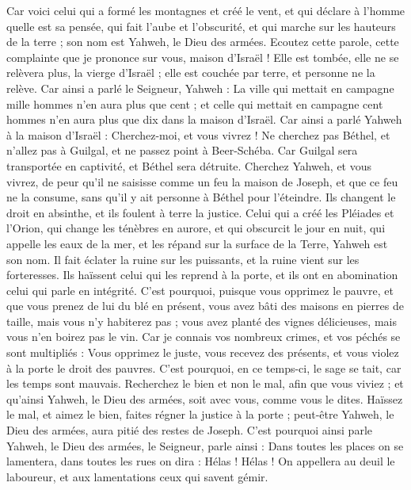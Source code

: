 \begin{multicols}{2}
Car voici celui qui a formé les montagnes et créé le vent, et qui déclare à l'homme quelle est sa pensée, qui fait l'aube et l'obscurité, et qui marche sur les hauteurs de la terre ; son nom est Yahweh, le Dieu des armées.
\VerseOne{}Ecoutez cette parole, cette complainte que je prononce sur vous, maison d'Israël !
Elle est tombée, elle ne se relèvera plus, la vierge d'Israël ; elle est couchée par terre, et personne ne la relève.
Car ainsi a parlé le Seigneur, Yahweh : La ville qui mettait en campagne mille hommes n'en aura plus que cent ; et celle qui mettait en campagne cent hommes n'en aura plus que dix dans la maison d’Israël.
Car ainsi a parlé Yahweh à la maison d'Israël : Cherchez-moi, et vous vivrez !
Ne cherchez pas Béthel, et n'allez pas à Guilgal, et ne passez point à Beer-Schéba. Car Guilgal sera transportée en captivité, et Béthel sera détruite.
Cherchez Yahweh, et vous vivrez, de peur qu'il ne saisisse comme un feu la maison de Joseph, et que ce feu ne la consume, sans qu'il y ait personne à Béthel pour l’éteindre.
Ils changent le droit en absinthe, et ils foulent à terre la justice.
Celui qui a créé les Pléiades et l'Orion, qui change les ténèbres en aurore, et qui obscurcit le jour en nuit, qui appelle les eaux de la mer, et les répand sur la surface de la Terre, Yahweh est son nom.
Il fait éclater la ruine sur les puissants, et la ruine vient sur les forteresses.
Ils haïssent celui qui les reprend à la porte, et ils ont en abomination celui qui parle en intégrité.
C'est pourquoi, puisque vous opprimez le pauvre, et que vous prenez de lui du blé en présent, vous avez bâti des maisons en pierres de taille, mais vous n'y habiterez pas ; vous avez planté des vignes délicieuses, mais vous n'en boirez pas le vin.
Car je connais vos nombreux crimes, et vos péchés se sont multipliés : Vous opprimez le juste, vous recevez des présents, et vous violez à la porte le droit des pauvres.
C'est pourquoi, en ce temps-ci, le sage se tait, car les temps sont mauvais.
Recherchez le bien et non le mal, afin que vous viviez ; et qu’ainsi Yahweh, le Dieu des armées, soit avec vous, comme vous le dites.
Haïssez le mal, et aimez le bien, faites régner la justice à la porte ; peut-être Yahweh, le Dieu des armées, aura pitié des restes de Joseph.
C'est pourquoi ainsi parle Yahweh, le Dieu des armées, le Seigneur, parle ainsi : Dans toutes les places on se lamentera, dans toutes les rues on dira : Hélas ! Hélas ! On appellera au deuil le laboureur, et aux lamentations ceux qui savent gémir.

\end{multicols}
